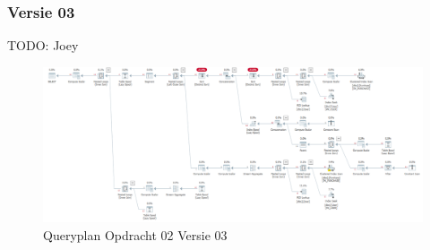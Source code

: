\subsubsection{Versie 03}
TODO: Joey

\begin{figure}[H]
    \centering
    \includegraphics[width=1\textwidth]{image/joey/opdracht-02a.PNG}
    \caption{Queryplan Opdracht 02 Versie 03}
\end{figure}

